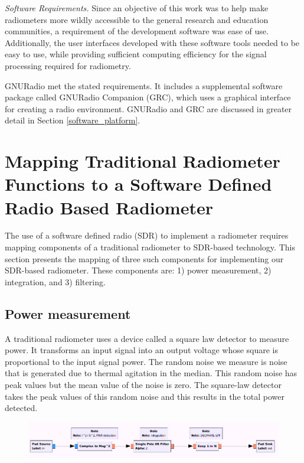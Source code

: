 \emph{Software Requirements.}  Since an objective of this work was to help make radiometers more wildly accessible to the general research and education communities, a requirement of the development software was ease of use.  Additionally, the user interfaces developed with these software tools needed to be easy to use, while providing sufficient computing efficiency for the signal processing required for radiometry.

GNURadio met the stated requirements.  It includes a supplemental software package called GNURadio Companion (GRC), which uses a graphical interface for creating a radio environment.  GNURadio and GRC are discussed in greater detail in Section \ref{software_platform}.


\section{Mapping Traditional Radiometer Functions to a Software Defined Radio Based Radiometer}

The use of a software defined radio (SDR) to implement a radiometer requires mapping components of a traditional radiometer to SDR-based technology.  This section presents the mapping of three such components for implementing our SDR-based radiometer.  These components are:  1) power measurement, 2) integration, and 3) filtering.

\subsection{Power measurement}

A traditional radiometer uses a device called a square law detector to measure power.  It transforms an input signal into an output voltage whose square is proportional to the input signal power.  The random noise we measure is noise that is generated due to thermal agitation in the median.  This random noise has peak values but the mean value of the noise is zero.  The square-law detector takes the peak values of this random noise and this results in the total power detected.

{\begin{figure}[h!tb] 
\centering
\includegraphics[width=17cm]{Images/TPR_grc.png}
\label{square_block}
\end{figure}
}

